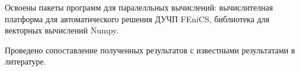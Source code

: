 
Освоены пакеты программ для паралелльных вычислений: вычислителная платформа для автоматического решения ДУЧП FEniCS, библиотека для векторных вычислений Numpy.

Проведено сопоставление полученных результатов с известными результатами в литературе.




\clearpage
